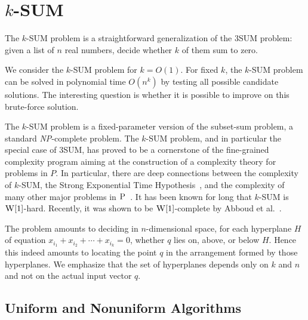 \section{\(k\)-SUM}


The \(k\)-SUM problem is a straightforward generalization of the 3SUM problem:
given a list of \(n\) real numbers, decide whether \(k\) of them sum to zero.



We consider the \(k\)-SUM problem for \(k=O(1)\).
For fixed \(k\), the \(k\)-SUM problem can be solved in polynomial time
\(O(n^k)\) by testing all possible candidate solutions.
The interesting question is whether it is possible to improve on
this brute-force solution.

The \(k\)-SUM problem is a fixed-parameter version of the subset-sum problem, a
standard \textit{NP}-complete problem. The \(k\)-SUM problem, and in particular
the special case of 3SUM, has proved to be a cornerstone of the fine-grained
complexity program aiming at the construction of a complexity theory for
problems in $P$. In particular, there are deep connections between the
complexity of \(k\)-SUM, the Strong Exponential Time
Hypothesis~\cite{PW10,CGIMPS15}, and the complexity of many other major
problems in
\(\textsc{P}\)~\cite{GO95,BH99,MO01,P10,ACLL14,AVW14,GP18,KPP14,ALW14,AWY15,CL15}.
It has been known for long that \(k\)-SUM is $\textsc{W}[1]$-hard. Recently, it was shown
to be $\textsc{W}[1]$-complete by Abboud et al.~\cite{ALW14}.

The problem amounts to deciding in $n$-dimensional space, for each hyperplane
\(H\) of equation \(x_{i_1} + x_{i_2} + \cdots +x_{i_k} = 0\), whether \(q\)
lies on, above, or below \(H\). Hence this indeed amounts to locating the point
$q$ in the arrangement formed by those hyperplanes. We emphasize that the set
of hyperplanes depends only on $k$ and $n$ and not on the actual input vector
$q$.

\subsection{Uniform and Nonuniform Algorithms}

